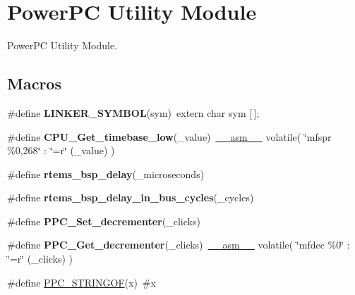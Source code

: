 \hypertarget{group__RTEMSBSPsPowerPCSharedUtility}{}\section{Power\+PC Utility Module}
\label{group__RTEMSBSPsPowerPCSharedUtility}


Power\+PC Utility Module.  


\subsection*{Macros}
\begin{DoxyCompactItemize}
\item 
\mbox{\label{group__RTEMSBSPsPowerPCSharedUtility_ga43e37a99d3603a193f318c1a2bb2edd9}} 
\#define {\bfseries L\+I\+N\+K\+E\+R\+\_\+\+S\+Y\+M\+B\+OL}(sym)~extern char sym \mbox{[}$\,$\mbox{]};
\item 
\mbox{\label{group__RTEMSBSPsPowerPCSharedUtility_ga26622b57f530f3700ff6e9dca978a958}} 
\#define {\bfseries C\+P\+U\+\_\+\+Get\+\_\+timebase\+\_\+low}(\+\_\+value)~\mbox{\hyperlink{group__RTEMSScoreCPUSPARC_ga82257d4fc068f4b21b029dd69d276839}{\+\_\+\+\_\+asm\+\_\+\+\_\+}} volatile( \char`\"{}mfspr \%0,268\char`\"{} \+: \char`\"{}=r\char`\"{} (\+\_\+value) )
\item 
\#define {\bfseries rtems\+\_\+bsp\+\_\+delay}(\+\_\+microseconds)
\item 
\#define {\bfseries rtems\+\_\+bsp\+\_\+delay\+\_\+in\+\_\+bus\+\_\+cycles}(\+\_\+cycles)
\item 
\#define {\bfseries P\+P\+C\+\_\+\+Set\+\_\+decrementer}(\+\_\+clicks)
\item 
\mbox{\label{group__RTEMSBSPsPowerPCSharedUtility_gaec80a8f80a30f4b758882df0dfda7929}} 
\#define {\bfseries P\+P\+C\+\_\+\+Get\+\_\+decrementer}(\+\_\+clicks)~\mbox{\hyperlink{group__RTEMSScoreCPUSPARC_ga82257d4fc068f4b21b029dd69d276839}{\+\_\+\+\_\+asm\+\_\+\+\_\+}} volatile( \char`\"{}mfdec  \%0\char`\"{} \+: \char`\"{}=r\char`\"{} (\+\_\+clicks) )
\item 
\mbox{\label{group__RTEMSBSPsPowerPCSharedUtility_ga82a438528227ca1a3c0236a75db36931}} 
\#define \mbox{\hyperlink{group__RTEMSBSPsPowerPCSharedUtility_ga82a438528227ca1a3c0236a75db36931}{P\+P\+C\+\_\+\+S\+T\+R\+I\+N\+G\+OF}}(x)~\#x

\end{DoxyCompactItemize}
